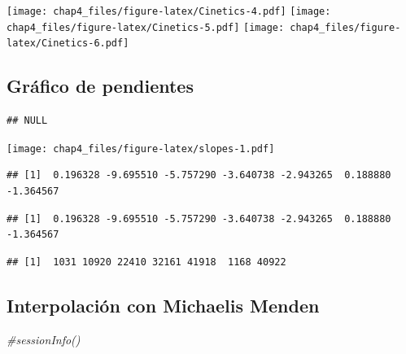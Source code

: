 \documentclass[]{article}
\newenvironment{Shaded}{\begin{snugshade}}{\end{snugshade}}
\newcommand{\CommentTok}[1]{\textcolor[rgb]{0.56,0.35,0.01}{\textit{{#1}}}}
\begin{document}
{\texttt{[image: chap4\_files/figure-latex/Cinetics-4.pdf]}
\texttt{[image: chap4\_files/figure-latex/Cinetics-5.pdf]}
\texttt{[image: chap4\_files/figure-latex/Cinetics-6.pdf]}

\subsection{Gráfico de pendientes}\label{grafico-de-pendientes}

\begin{verbatim}
## NULL
\end{verbatim}

\texttt{[image: chap4\_files/figure-latex/slopes-1.pdf]}

\begin{verbatim}
## [1]  0.196328 -9.695510 -5.757290 -3.640738 -2.943265  0.188880 -1.364567
\end{verbatim}

\begin{verbatim}
## [1]  0.196328 -9.695510 -5.757290 -3.640738 -2.943265  0.188880 -1.364567
\end{verbatim}

\begin{verbatim}
## [1]  1031 10920 22410 32161 41918  1168 40922
\end{verbatim}

\subsection{Interpolación con Michaelis
Menden}\label{interpolacion-con-michaelis-menden}

\begin{Shaded}
\begin{Highlighting}[]
\CommentTok{#sessionInfo()}
\end{Highlighting}
\end{Shaded}
\end{document}
